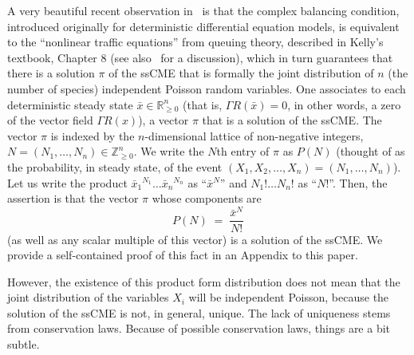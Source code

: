 \documentclass[11pt]{article}
\newcommand{\R}{{\mathbb R}}  %
\newcommand{\Z}{{\mathbb Z}}  %
\begin{document}
A very beautiful recent observation in~\cite{anderson08} is that the
complex balancing condition, introduced originally for deterministic
differential equation models, is equivalent to the ``nonlinear traffic
equations'' from queuing theory, described in Kelly's textbook\cite{kelly},
Chapter 8 (see also~\cite{mairesse09} for a discussion), which in turn
guarantees that there is a solution
$\pi $ of the ssCME that is formally the joint distribution of $n$ (the
number of species) independent Poisson random variables.
One associates to each deterministic steady state 
$\bar x\in \R^n_{\geq 0}$
(that is, $\Gamma R({\bar x})=0$, in other words, a zero of the vector field
$\Gamma R(x)$), a vector $\pi $ that is a solution of the ssCME.
The vector $\pi $ is indexed by the $n$-dimensional lattice of non-negative
integers, $N=(N_1,\ldots ,N_n)\in \Z^n_{\geq 0}$.
We write the $N$th entry of $\pi $ as $P(N)$ (thought of as the probability, in
steady state, of the event $(X_1,X_2,\ldots ,X_n)=(N_1,\ldots ,N_n)$).
Let us write the product ${\bar x_1}^{N_1}\ldots {\bar x_n}^{N_n}$ as
``${\bar x}^N$'' and $N_1!\ldots N_n!$ as ``$N!$''.
Then, the assertion is that the vector $\pi $ whose components are
\[
P(N)\;=\; \frac{{\bar x}^N}{N!}
\]
(as well as any scalar multiple of this vector) is a solution of the ssCME.
We provide a self-contained proof of this fact in an Appendix to this paper.

However, the existence of this product form distribution does not mean that
the joint distribution of the variables $X_i$ will be independent Poisson,
because the solution of the ssCME is not, in general, unique.  The lack of
uniqueness stems from conservation laws.
Because of possible conservation laws, things are a bit subtle.
\end{document}
